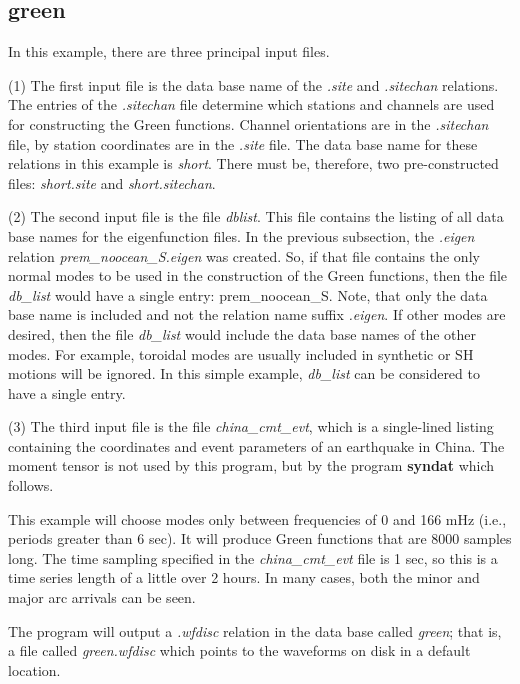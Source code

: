 \subsection{green}

In this example, there are three principal input files. 

(1) The first input file is the data base name of the {\it .site} and {\it .sitechan}
relations. The entries of the {\it .sitechan} file determine which stations and
channels are used for constructing the Green functions. Channel orientations are
in the {\it .sitechan} file, by station coordinates are in the {\it .site} file.
The data base name for these relations in this example is {\it short}.
There must be, therefore, two pre-constructed files: {\it short.site} and {\it short.sitechan}.

(2) The second input file is the file {\it dblist}.
This file contains the listing of all data base names for the eigenfunction files.
In the previous subsection, the {\it .eigen} relation {\it prem\_noocean\_S.eigen}
was created. So, if that file contains the only normal modes to be used in the
construction of the Green functions, then the file {\it db\_list} would have a 
single entry: prem\_noocean\_S. Note, that only the data base name is included and
not the relation name suffix {\it .eigen}. If other modes are desired, then the file
{\it db\_list} would include the data base names of the other modes. For example,
toroidal modes are usually included in synthetic or SH motions will be ignored. In
this simple example, {\it db\_list} can be considered to have a single entry.

(3) The third input file is the file {\it china\_cmt\_evt}, which is a single-lined listing
containing the coordinates and event parameters of an earthquake in China. The moment tensor
is not used by this program, but by the program {\bf syndat} which follows.

This example will choose modes only between frequencies of 0 and 166 mHz
(i.e., periods greater than 6 sec). It will produce Green functions that are 8000 samples
long. The time sampling specified in the {\it china\_cmt\_evt} file is 1 sec, so this
is a time series length of a little over 2 hours. In many cases, both the minor and
major arc arrivals can be seen.

The program will output a {\it .wfdisc} relation in the data base called {\it green};
that is, a file called {\it green.wfdisc} which points to the waveforms on disk in a default
location.


